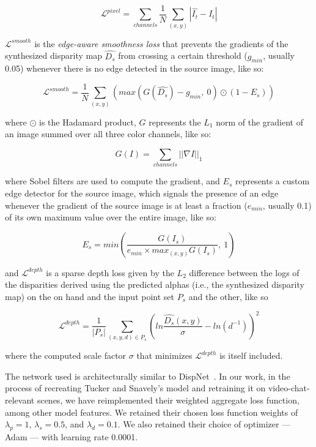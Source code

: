 \begin{itemize}
    \[\mathcal{L}^{pixel} = \sum_{channels} \frac{1}{N} \sum_{(x,y)} |\hat{I_t} - I_t|\]
    
    $\mathcal{L}^{smooth}$ is the \textit{edge-aware smoothness loss} that prevents the gradients of the synthesized disparity map $\hat{D_s}$ from crossing a certain threshold ($g_{min}$, usually 0.05) whenever there is no edge detected in the source image, like so: 
    
    \[\mathcal{L}^{smooth} = \frac{1}{N} \sum_{(x,y)} \left(max\left(G(\hat{D_s}) - g_{min},\ 0\right) \odot (1 - E_s)\right)\]
    
    where $\odot$ is the Hadamard product, $G$ represents the $L_1$ norm of the gradient of an image summed over all three color channels, like so:
    
    \[G(I) = \sum_{channels} ||\nabla I||_1\]
    
    where Sobel filters are used to compute the gradient, and $E_s$ represents a custom edge detector for the source image, which signals the presence of an edge whenever the gradient of the source image is at least a fraction ($e_{min}$, usually 0.1) of its own maximum value over the entire image, like so:
    
    \[E_s = min \left(\frac{G(I_s)}{e_{min} \times max_{(x,y)} G(I_s)},\ 1\right)\]
    
    and $\mathcal{L}^{depth}$ is a sparse depth loss given by the $L_2$ difference between the logs of the disparities derived using the predicted alphas (i.e., the synthesized disparity map) on the on hand and the input point set $P_s$ and the other, like so
    
    \[\mathcal{L}^{depth} = \frac{1}{|P_s|} \sum_{(x,y,d) \in P_s} \left(ln\frac{\hat{D_s}(x,y)}{\sigma} - ln(d^{-1})\right)^2\]
    
    where the computed scale factor $\sigma$ that minimizes $\mathcal{L}^{depth}$ is itself included.
\end{itemize}

The network used is architecturally similar to DispNet~\cite{mayer_large_2016}. In our work, in the process of recreating Tucker and Snavely's model and retraining it on video-chat-relevant scenes, we have reimplemented their weighted aggregate loss function, among other model features. We retained their chosen loss function weights of $\lambda_p = 1$, $\lambda_s = 0.5$, and $\lambda_d = 0.1$. We also retained their choice of optimizer --- Adam --- with learning rate 0.0001.

